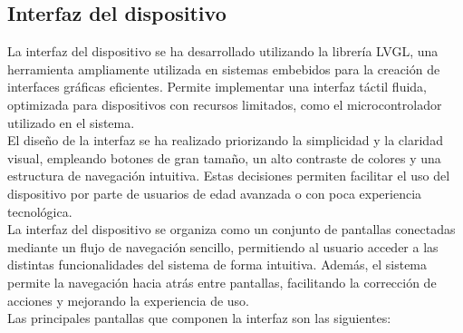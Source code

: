 \subsection{Interfaz del dispositivo}
\label{sec:interfaz_dispositivo}

La interfaz del dispositivo se ha desarrollado utilizando la librería LVGL, una herramienta ampliamente utilizada en sistemas embebidos para la creación de interfaces gráficas eficientes. Permite implementar una interfaz táctil fluida, optimizada para dispositivos con recursos limitados, como el microcontrolador utilizado en el sistema.\\

El diseño de la interfaz se ha realizado priorizando la simplicidad y la claridad visual, empleando botones de gran tamaño, un alto contraste de colores y una estructura de navegación intuitiva. Estas decisiones permiten facilitar el uso del dispositivo por parte de usuarios de edad avanzada o con poca experiencia tecnológica.\\

La interfaz del dispositivo se organiza como un conjunto de pantallas conectadas mediante un flujo de navegación sencillo, permitiendo al usuario acceder a las distintas funcionalidades del sistema de forma intuitiva. Además, el sistema permite la navegación hacia atrás entre pantallas, facilitando la corrección de acciones y mejorando la experiencia de uso.\\

Las principales pantallas que componen la interfaz son las siguientes:

